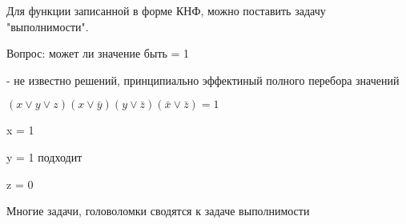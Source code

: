 \documentclass[russian]{lecture-notes}
\begin{document}
	\begin{remark}
		Для функции записанной в форме КНФ, можно поставить задачу "выполнимости".

		Вопрос: может ли значение быть = 1

		- не известно решений, принципиально эффектиный полного перебора значений

		\end{remark}

	\begin{example}
	$(x \lor y \lor z)(x \lor \bar{y})(y \lor \bar{z})(\bar{x} \lor \bar{z}) = 1$

		x = 1

		y = 1 \qquad подходит

		z = 0

	\end{example}

	Многие задачи, головоломки сводятся к задаче выполнимости
\end{document}
